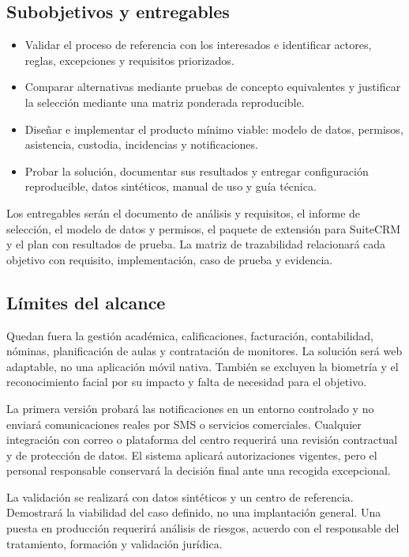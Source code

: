 \subsection{Subobjetivos y entregables}\label{sec:1-3-2}

\begin{itemize}
  \item Validar el proceso de referencia con los interesados e identificar actores, reglas, excepciones y requisitos priorizados.
  \item Comparar alternativas mediante pruebas de concepto equivalentes y justificar la selección mediante una matriz ponderada reproducible.
  \item Diseñar e implementar el producto mínimo viable: modelo de datos, permisos, asistencia, custodia, incidencias y notificaciones.
  \item Probar la solución, documentar sus resultados y entregar configuración reproducible, datos sintéticos, manual de uso y guía técnica.
\end{itemize}

Los entregables serán el documento de análisis y requisitos, el informe de selección, el modelo de datos y permisos, el paquete de extensión para SuiteCRM y el plan con resultados de prueba. La matriz de trazabilidad relacionará cada objetivo con requisito, implementación, caso de prueba y evidencia.

\subsection{Límites del alcance}\label{sec:1-3-3}

Quedan fuera la gestión académica, calificaciones, facturación, contabilidad, nóminas, planificación de aulas y contratación de monitores. La solución será web adaptable, no una aplicación móvil nativa. También se excluyen la biometría y el reconocimiento facial por su impacto y falta de necesidad para el objetivo.

La primera versión probará las notificaciones en un entorno controlado y no enviará comunicaciones reales por SMS o servicios comerciales. Cualquier integración con correo o plataforma del centro requerirá una revisión contractual y de protección de datos. El sistema aplicará autorizaciones vigentes, pero el personal responsable conservará la decisión final ante una recogida excepcional.

La validación se realizará con datos sintéticos y un centro de referencia. Demostrará la viabilidad del caso definido, no una implantación general. Una puesta en producción requerirá análisis de riesgos, acuerdo con el responsable del tratamiento, formación y validación jurídica.

